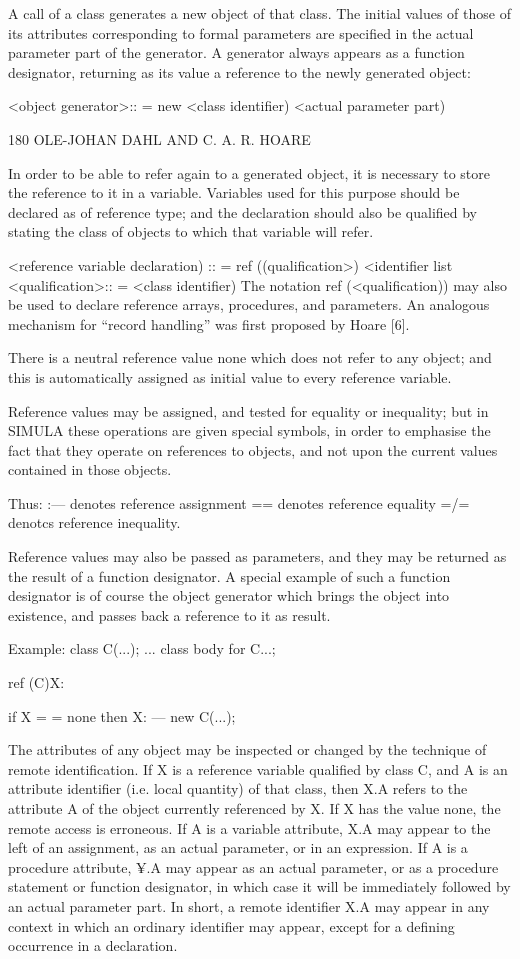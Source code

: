 A call of a class generates a new object of that class. The initial values of those of its attributes corresponding to formal parameters are specified in the actual parameter part of the generator. A generator always appears as a function designator, returning as its value a reference to the newly generated object:

<object generator>:: = new <class identifier) <actual parameter part)

180 OLE-JOHAN DAHL AND C. A. R. HOARE

In order to be able to refer again to a generated object, it is necessary to store the reference to it in a variable. Variables used for this purpose should be declared as of reference type; and the declaration should also be qualified by stating the class of objects to which that variable will refer.

<reference variable declaration) :: = ref ((qualification>) <identifier list <qualification>:: = <class identifier) The notation ref (<qualification)) may also be used to declare reference arrays, procedures, and parameters. An analogous mechanism for “record handling” was first proposed by Hoare [6].

There is a neutral reference value none which does not refer to any object; and this is automatically assigned as initial value to every reference variable.

Reference values may be assigned, and tested for equality or inequality; but in SIMULA these operations are given special symbols, in order to emphasise the fact that they operate on references to objects, and not upon the current values contained in those objects.

Thus: :— denotes reference assignment == denotes reference equality =/= denotcs reference inequality.

Reference values may also be passed as parameters, and they may be returned as the result of a function designator. A special example of such a function designator is of course the object generator which brings the object into existence, and passes back a reference to it as result.

Example: class C(...); ... class body for C...;

ref (C)X:

if X = = none then X: — new C(...);

The attributes of any object may be inspected or changed by the technique of remote identification. If X is a reference variable qualified by class C, and A is an attribute identifier (i.e. local quantity) of that class, then X.A refers to the attribute A of the object currently referenced by X. If X has the value none, the remote access is erroneous. If A is a variable attribute, X.A may appear to the left of an assignment, as an actual parameter, or in an expression. If A is a procedure attribute, ¥.A may appear as an actual parameter, or as a procedure statement or function designator, in which case it will be immediately followed by an actual parameter part. In short, a remote identifier X.A may appear in any context in which an ordinary identifier may appear, except for a defining occurrence in a declaration.

